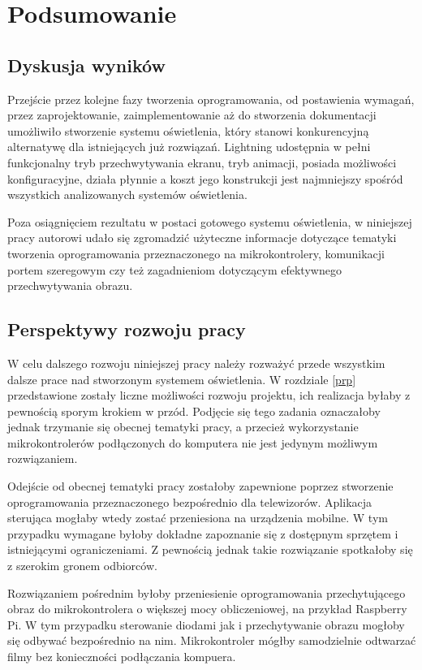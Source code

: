 \documentclass[12pt]{report}
\begin{document}
\chapter{Podsumowanie}

\section{Dyskusja wyników}

Przejście przez kolejne fazy tworzenia oprogramowania, od postawienia wymagań, przez zaprojektowanie, zaimplementowanie aż do stworzenia dokumentacji umożliwiło stworzenie systemu oświetlenia, który stanowi konkurencyjną alternatywę dla istniejących już rozwiązań.  Lightning udostępnia w pełni funkcjonalny tryb przechwytywania ekranu, tryb animacji, posiada możliwości konfiguracyjne, działa płynnie a koszt jego konstrukcji jest najmniejszy spośród wszystkich analizowanych systemów oświetlenia.

Poza osiągnięciem rezultatu w postaci gotowego systemu oświetlenia, w niniejszej pracy autorowi udało się zgromadzić użyteczne informacje dotyczące tematyki tworzenia oprogramowania przeznaczonego na mikrokontrolery, komunikacji portem szeregowym czy też zagadnieniom dotyczącym efektywnego przechwytywania obrazu.

\section{Perspektywy rozwoju pracy}

W celu dalszego rozwoju niniejszej pracy należy rozważyć przede wszystkim dalsze prace nad stworzonym systemem oświetlenia. W rozdziale \ref{prp} przedstawione zostały liczne możliwości rozwoju projektu, ich realizacja byłaby z pewnością sporym krokiem w przód. Podjęcie się tego zadania oznaczałoby jednak trzymanie się obecnej tematyki pracy, a przecież wykorzystanie mikrokontrolerów podłączonych do komputera nie jest jedynym możliwym rozwiązaniem. 

Odejście od obecnej tematyki pracy zostałoby zapewnione poprzez stworzenie oprogramowania przeznaczonego bezpośrednio dla telewizorów. Aplikacja steru\-jąca mogłaby wtedy zostać przeniesiona na urządzenia mobilne. W tym przypadku wymagane byłoby dokładne zapoznanie się z dostępnym sprzętem i istniejącymi ograniczeniami. Z pewnością jednak takie rozwiązanie spotkałoby się z szerokim gronem odbiorców.

Rozwiązaniem pośrednim byłoby przeniesienie oprogramowania przechytującego obraz do mikrokontrolera o większej mocy obliczeniowej, na przykład Raspberry Pi. W tym przypadku sterowanie diodami jak i przechytywanie obrazu mogłoby się odbywać bezpośrednio na nim. Mikrokontroler mógłby samodzielnie odtwarzać filmy bez konieczności podłączania kompuera.
\end{document}

